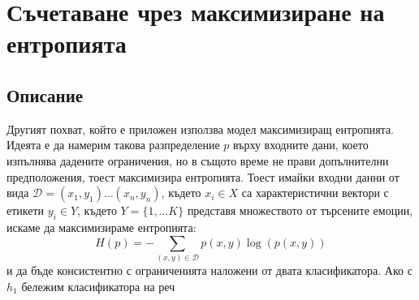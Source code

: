 \documentclass[main.tex]{subfiles}
\begin{document}
\section{Съчетаване чрез максимизиране на ентропията}
\subsection{Описание}
Другият похват, който е приложен използва модел максимизиращ ентропията. Идеята е да намерим такова разпределение $p$ върху входните дани, което изпълнява дадените ограничения, но в същото време не прави допълнителни предположения, тоест максимизира ентропията.
Тоест имайки входни данни от вида $\mathcal{D} = (x_1, y_1)\ldots (x_n, y_n)$, където $x_i \in X$ са характеристични вектори с етикети $y_i \in Y$, където $Y = \{1,\ldots K\}$ представя множеството от търсените емоции, искаме да максимизираме ентропията:
\[
H(p) = - \sum\limits_{(x, y) \in \mathcal{D}} p(x, y) \log(p(x, y))    
\]
и да бъде консистентно с ограниченията наложени от двата класификатора. Ако с $h_1$ бележим класификатора на реч
\end{document}
